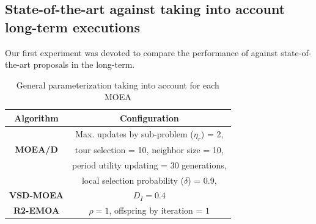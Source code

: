 \subsection{State-of-the-art \MOEAS{} against \VSDMOEA{} taking into account long-term executions}

Our first experiment was devoted to compare the performance of \VSDMOEA{} against state-of-the-art proposals in the long-term.


%
\begin{table}[t]
\centering
\caption{ General parameterization taking into account for each MOEA}
\label{tab:Parametrization}
\begin{tabular}{c|c}
\hline
\textbf{Algorithm} & \textbf{Configuration} \\ \hline
\multirow{3}{*}{\textbf{MOEA/D}} &Max. updates by sub-problem ($\eta_r$) = 2, \\
 & tour selection = 10,   neighbor size = 10, \\
 & period utility updating = 30 generations, \\ 
 & local selection probability ($\delta$) = 0.9,\\ \hline
\textbf{VSD-MOEA} & $D_I=0.4$ \\ \hline
\textbf{R2-EMOA} & $\rho=1$, offspring by iteration = $1$ \\ \hline
\end{tabular}
\end{table}







